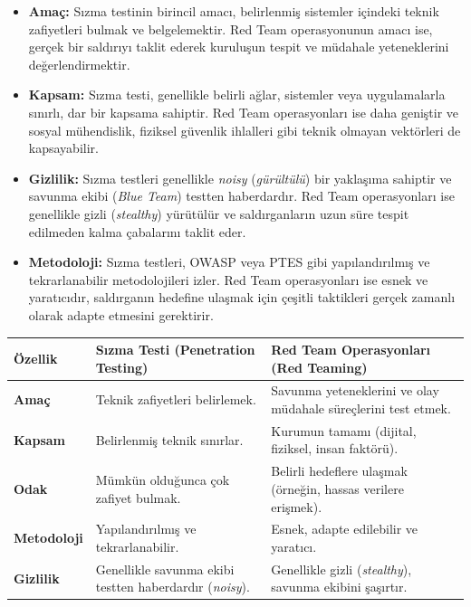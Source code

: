 \begin{itemize}
\item \textbf{Amaç:} Sızma testinin birincil amacı, belirlenmiş sistemler içindeki teknik zafiyetleri bulmak ve belgelemektir. Red Team operasyonunun amacı ise, gerçek bir saldırıyı taklit ederek kuruluşun tespit ve müdahale yeteneklerini değerlendirmektir.
\item \textbf{Kapsam:} Sızma testi, genellikle belirli ağlar, sistemler veya uygulamalarla sınırlı, dar bir kapsama sahiptir. Red Team operasyonları ise daha geniştir ve sosyal mühendislik, fiziksel güvenlik ihlalleri gibi teknik olmayan vektörleri de kapsayabilir.
\item \textbf{Gizlilik:} Sızma testleri genellikle \textit{noisy} (\textit{gürültülü}) bir yaklaşıma sahiptir ve savunma ekibi (\textit{Blue Team}) testten haberdardır. Red Team operasyonları ise genellikle gizli (\textit{stealthy}) yürütülür ve saldırganların uzun süre tespit edilmeden kalma çabalarını taklit eder.
\item \textbf{Metodoloji:} Sızma testleri, OWASP veya PTES gibi yapılandırılmış ve tekrarlanabilir metodolojileri izler. Red Team operasyonları ise esnek ve yaratıcıdır, saldırganın hedefine ulaşmak için çeşitli taktikleri gerçek zamanlı olarak adapte etmesini gerektirir.
\end{itemize}

\begin{center}
\begin{tabular}{|p{4cm}|p{6cm}|p{4cm}|}
\hline
\hline
\textbf{Özellik} & \textbf{Sızma Testi (Penetration Testing)} & \textbf{Red Team Operasyonları (Red Teaming)} \\
\hline
\hline
\textbf{Amaç} & Teknik zafiyetleri belirlemek. & Savunma yeteneklerini ve olay müdahale süreçlerini test etmek. \\
\hline
\hline
\textbf{Kapsam} & Belirlenmiş teknik sınırlar. & Kurumun tamamı (dijital, fiziksel, insan faktörü). \\
\hline
\hline
\textbf{Odak} & Mümkün olduğunca çok zafiyet bulmak. & Belirli hedeflere ulaşmak (örneğin, hassas verilere erişmek). \\
\hline
\hline
\textbf{Metodoloji} & Yapılandırılmış ve tekrarlanabilir. & Esnek, adapte edilebilir ve yaratıcı. \\
\hline
\hline
\textbf{Gizlilik} & Genellikle savunma ekibi testten haberdardır (\textit{noisy}). & Genellikle gizli (\textit{stealthy}), savunma ekibini şaşırtır. \\
\hline
\hline
\hline
\end{tabular}
\end{center}

